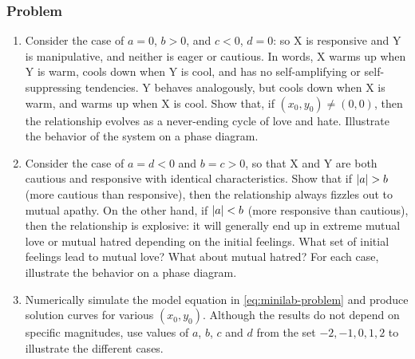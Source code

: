 \documentclass[12pt]{article}
\begin{document}
\subsubsection*{Problem}
\begin{enumerate}
\item Consider the case of $a = 0$, $b > 0$, and $c < 0$, $d = 0$: so X is
  responsive and Y is manipulative, and neither is eager or cautious. In words,
  X warms up when Y is warm, cools down when Y is cool, and has no
  self-amplifying or self-suppressing tendencies. Y behaves analogously, but
  cools down when X is warm, and warms up when X is cool. Show that, if
  $(x_0,y_0)\ne(0,0)$, then the relationship evolves as a never-ending cycle of
  love and hate. Illustrate the behavior of the system on a phase diagram.
\item Consider the case of $a = d < 0$ and $b = c > 0$, so that X and Y are both
  cautious and responsive with identical characteristics. Show that if $\left|{a}\right|
  > b$ (more cautious than responsive), then the relationship always fizzles out
  to mutual apathy. On the other hand, if $\left|{a}\right| < b$ (more responsive than
  cautious), then the relationship is explosive: it will generally end up in
  extreme mutual love or mutual hatred depending on the initial feelings. What
  set of initial feelings lead to mutual love? What about mutual hatred? For
  each case, illustrate the behavior on a phase diagram.
\item Numerically simulate the model equation in \cref{eq:minilab-problem} and
  produce solution curves for various $(x_0,y_0)$. Although the results do not
  depend on specific magnitudes, use values of $a$, $b$, $c$ and $d$ from the
  set ${-2, -1, 0, 1, 2}$ to illustrate the different cases.
\end{enumerate}
\end{document}
